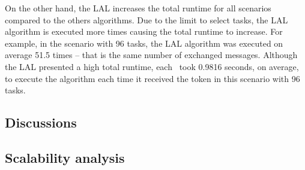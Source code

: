 On the other hand, the LAL increases the total runtime for all scenarios compared to the others algorithms.
Due to the limit to select tasks, the LAL algorithm is executed more times causing the total runtime to increase. 
For example, in the scenario with 96 tasks, the LAL algorithm was executed on average 51.5 times -- that is the same number of exchanged messages. 
Although the LAL presented a high total runtime, each \uav\ took 0.9816 seconds, on average, to execute the algorithm each time it received the token in this scenario with 96 tasks.

\subsection{Discussions} \label{sec:discussion}


\subsection{Scalability analysis} \label{sec:scalability}


